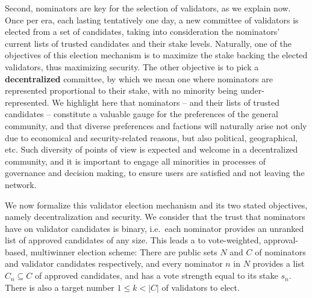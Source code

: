Second, nominators are key for the selection of validators, as we explain now. Once per era, each lasting tentatively one day, a new committee of validators is elected from a set of candidates, taking into consideration the nominators' current lists of trusted candidates and their stake levels. Naturally, one of the objectives of this election mechanism is to maximize the stake backing the elected validators, thus maximizing security. The other objective is to pick a \textbf{decentralized} committee, by which we mean one where nominators are represented proportional to their stake, with no minority being under-represented. 
We highlight here that nominators -- and their lists of trusted candidates -- constitute a valuable gauge for the preferences of the general community, and that diverse preferences and factions will naturally arise not only due to economical and security-related reasons, but also political, geographical, etc. Such diversity of points of view is expected and welcome in a decentralized community, and it is important to engage all minorities in processes of governance and decision making, to ensure users are satisfied and not leaving the network. 

We now formalize this validator election mechanism and its two stated objectives, namely decentralization and security.
We consider that the trust that nominators have on validator candidates is binary, i.e.~each nominator provides an unranked list of approved candidates of any size. 
This leads a to vote-weighted, approval-based, multiwinner election scheme: 
There are public sets $N$ and $C$ of nominators and validator candidates respectively, and every nominator $n$ in $N$ provides a list $C_n\subseteq C$ of approved candidates, and has a vote strength equal to its stake $s_n$. There is also a target number $1\leq k<|C|$ of validators to elect.


